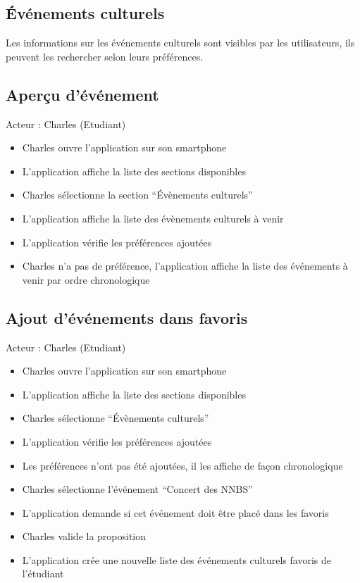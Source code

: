 \newpage

\subsection{Événements culturels}

Les informations sur les événements culturels sont visibles par les utilisateurs, ils peuvent les rechercher selon leurs préférences.

\subsection*{Aperçu d’événement}
Acteur : Charles (Etudiant)
\begin{itemize}
\item Charles ouvre l’application sur son smartphone 
\item L’application affiche la liste des sections disponibles 
\item Charles sélectionne la section “Évènements culturels” 
\item L’application affiche la liste des évènements culturels à venir 
\item L’application vérifie les préférences ajoutées  
\item Charles n’a pas de préférence, l’application affiche la liste des événements à venir par ordre chronologique 
\end{itemize}

\subsection*{Ajout d’événements dans favoris}
Acteur : Charles (Etudiant)
\begin{itemize}
\item Charles ouvre l’application sur son smartphone 
\item L’application affiche la liste des sections disponibles 
\item Charles sélectionne “Évènements culturels” 
\item L’application vérifie les préférences ajoutées  
\item Les préférences n’ont pas été ajoutées, il les affiche de façon chronologique 
\item Charles sélectionne l’événement “Concert des NNBS” 
\item L’application demande si cet événement doit être placé dans les favoris 
\item Charles valide la proposition 
\item L’application crée une nouvelle liste des événements culturels favoris de l’étudiant 
\end{itemize}

